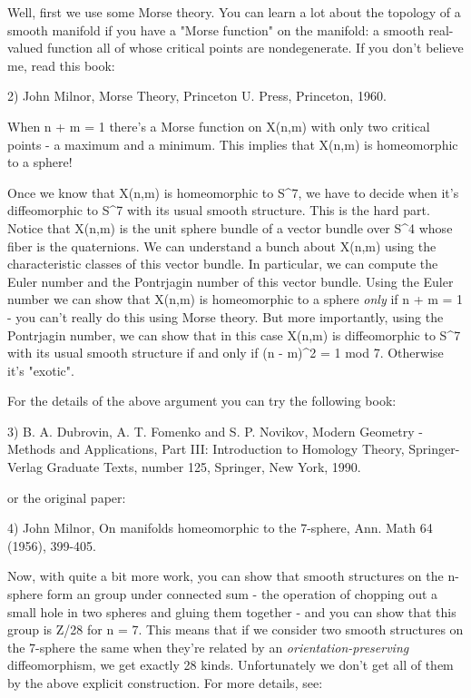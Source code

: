 Well, first we use some Morse theory.  You can learn a lot about the
topology of a smooth manifold if you have a "Morse function" on the 
manifold: a smooth real-valued function all of whose critical points 
are nondegenerate.  If you don't believe me, read this book:

2) John Milnor, Morse Theory, Princeton U. Press, Princeton, 1960.

When n + m = 1 there's a Morse function on X(n,m) with only two critical 
points - a maximum and a minimum.  This implies that X(n,m) is 
homeomorphic to a sphere!

Once we know that X(n,m) is homeomorphic to S^{7}, we have to decide 
when it's diffeomorphic to S^{7} with its usual smooth structure.  
This is the hard part.  Notice that X(n,m) is the unit sphere bundle of
a vector bundle over S^{4} whose fiber is the quaternions.  We can
understand a bunch about X(n,m) using the characteristic classes
of this vector bundle.  In particular, we can compute the Euler 
number and the Pontrjagin number of this vector bundle.  Using the
Euler number we can show that X(n,m) is homeomorphic to a sphere
\emph{only} if n + m = 1 - you can't really do this using Morse theory.
But more importantly, using the Pontrjagin number, we can show that 
in this case X(n,m) is diffeomorphic to S^{7} with its usual smooth 
structure if and only if (n - m)^{2} = 1 mod 7.  Otherwise 
it's "exotic".

For the details of the above argument you can try the following book:

3) B. A. Dubrovin, A. T. Fomenko and S. P. Novikov, Modern Geometry -
Methods and Applications, Part III: Introduction to Homology Theory,
Springer-Verlag Graduate Texts, number 125, Springer, New York, 1990.

or the original paper:

4) John Milnor, On manifolds homeomorphic to the 7-sphere, Ann.
Math 64 (1956), 399-405.

Now, with quite a bit more work, you can show that smooth structures on
the n-sphere form an group under connected sum - the operation of chopping 
out a small hole in two spheres and gluing them together - and you can 
show that this group is Z/28 for n = 7.  This means that if we consider 
two smooth structures on the 7-sphere the same when they're related by 
an \emph{orientation-preserving} diffeomorphism, we get exactly 28 kinds.  
Unfortunately we don't get all of them by the above explicit construction.
For more details, see:

